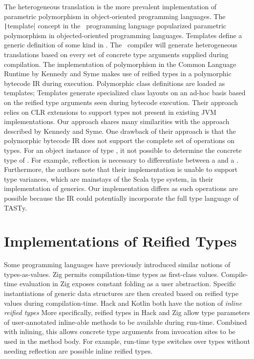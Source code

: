 The heterogeneous translation is the more prevalent implementation of parametric polymorphism in object-oriented programming languages.
The \texttt|template| concept in the \CC\ programming language popularized parametric polymorphism in objected-oriented programming languages.
Templates define a generic definition of some kind in \CC.
The \CC\ compiler will generate heterogeneous translations based on every set of concrete type arguments supplied during compilation.
The implementation of polymorphism in the Common Language Runtime\cite{clr:overview,clr:spec} by Kennedy and Syme makes use of reified types in a polymorphic bytecode IR during execution.
Polymorphic class definitions are loaded as templates; Templates generate specialized class layouts on an ad-hoc basis based on the reified type arguments seen during bytecode execution.
Their approach relies on CLR extensions to support types not present in existing JVM implementations.
Our approach shares many similarities with the approach described by Kennedy and Syme.
One drawback of their approach is that the polymorphic bytecode IR does not support the complete set of operations on types.
For an object instance of type , it not possible to determine the concrete type of .
For example, reflection is necessary to differentiate between a  and a .
Furthermore, the authors note that their implementation is unable to support type variances, which are mainstays of the Scala type system, in their implementation of generics.
Our implementation differs as such operations are possible because the IR could potentially incorporate the full type language of TASTy.

\section{Implementations of Reified Types}

Some programming languages have previously introduced similar notions of types-as-values.
Zig\cite{zig} permits compilation-time types as first-class values. 
Compile-time evaluation in Zig exposes constant folding as a user abstraction.
Specific instantiations of generic data structures are then created based on reified type values during compilation-time.
Hack\cite{hack:inline-reified-types} and Kotlin\cite{kotlin:inline-reified-types} both have the notion of \textit{inline reified types}
More specifically, reified types in Hack and Zig allow type parameters of user-annotated inline-able methods to be available during run-time. 
Combined with inlining, this allows concrete type arguments from invocation sites to be used in the method body.
For example, run-time type switches over types without needing reflection are possible inline reified types.

